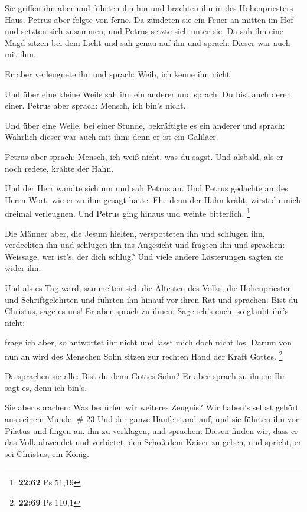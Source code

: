  Sie griffen ihn aber und führten ihn hin und brachten ihn
in des Hohenpriesters Haus. Petrus aber folgte von ferne. 
Da zündeten sie ein Feuer an mitten im Hof und setzten sich zusammen;
und Petrus setzte sich unter sie.  Da sah ihn eine Magd
sitzen bei dem Licht und sah genau auf ihn und sprach: Dieser war auch
mit ihm.

 Er aber verleugnete ihn und sprach: Weib, ich kenne ihn
nicht.

 Und über eine kleine Weile sah ihn ein anderer und sprach:
Du bist auch deren einer. Petrus aber sprach: Mensch, ich bin's nicht.

 Und über eine Weile, bei einer Stunde, bekräftigte es ein
anderer und sprach: Wahrlich dieser war auch mit ihm; denn er ist ein
Galiläer.

 Petrus aber sprach: Mensch, ich weiß nicht, was du sagst.
Und alsbald, als er noch redete, krähte der Hahn.

 Und der Herr wandte sich um und sah Petrus an. Und Petrus
gedachte an des Herrn Wort, wie er zu ihm gesagt hatte: Ehe denn der
Hahn kräht, wirst du mich dreimal verleugnen.  Und Petrus
ging hinaus und weinte bitterlich. \footnote{\textbf{22:62} Ps 51,19}

 Die Männer aber, die Jesum hielten, verspotteten ihn und
schlugen ihn,  verdeckten ihn und schlugen ihn ins
Angesicht und fragten ihn und sprachen: Weissage, wer ist's, der dich
schlug?  Und viele andere Lästerungen sagten sie wider ihn.

 Und als es Tag ward, sammelten sich die Ältesten des
Volks, die Hohenpriester und Schriftgelehrten und führten ihn hinauf vor
ihren Rat  und sprachen: Bist du Christus, sage es uns! Er
aber sprach zu ihnen: Sage ich's euch, so glaubt ihr's nicht;

 frage ich aber, so antwortet ihr nicht und lasst mich doch
nicht los.  Darum von nun an wird des Menschen Sohn sitzen
zur rechten Hand der Kraft Gottes. \footnote{\textbf{22:69} Ps 110,1}

 Da sprachen sie alle: Bist du denn Gottes Sohn? Er aber
sprach zu ihnen: Ihr sagt es, denn ich bin's.

 Sie aber sprachen: Was bedürfen wir weiteres Zeugnis? Wir
haben's selbst gehört aus seinem Munde. \# 23  Und der ganze
Haufe stand auf, und sie führten ihn vor Pilatus  und fingen
an, ihn zu verklagen, und sprachen: Diesen finden wir, dass er das Volk
abwendet und verbietet, den Schoß dem Kaiser zu geben, und spricht, er
sei Christus, ein König.

